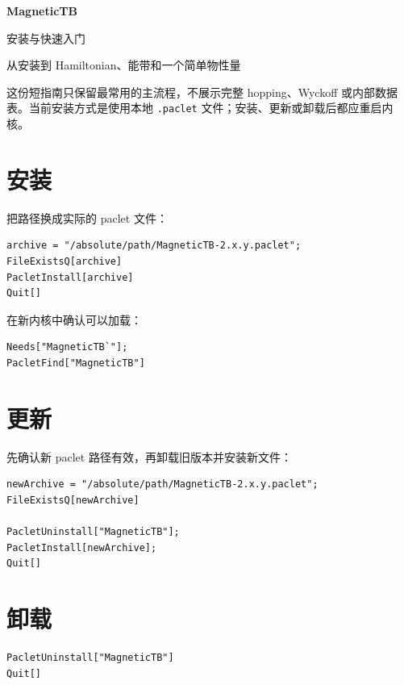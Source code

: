 \documentclass[UTF8,fontset=mac,11pt]{ctexart}
\begin{document}
\begin{center}
  {\Huge\bfseries\color{MagneticTBBlue} MagneticTB}\par
  \vspace{0.35em}
  {\LARGE 安装与快速入门}\par
  \vspace{0.7em}
  {\large 从安装到 Hamiltonian、能带和一个简单物性量}
\end{center}

\vspace{0.8em}

这份短指南只保留最常用的主流程，不展示完整 hopping、Wyckoff
或内部数据表。当前安装方式是使用本地 \texttt{.paclet} 文件；安装、更新或卸载后都应重启内核。

\section{安装}

把路径换成实际的 paclet 文件：

\begin{lstlisting}
archive = "/absolute/path/MagneticTB-2.x.y.paclet";
FileExistsQ[archive]
PacletInstall[archive]
Quit[]
\end{lstlisting}

在新内核中确认可以加载：

\begin{lstlisting}
Needs["MagneticTB`"];
PacletFind["MagneticTB"]
\end{lstlisting}

\section{更新}

先确认新 paclet 路径有效，再卸载旧版本并安装新文件：

\begin{lstlisting}
newArchive = "/absolute/path/MagneticTB-2.x.y.paclet";
FileExistsQ[newArchive]

PacletUninstall["MagneticTB"];
PacletInstall[newArchive];
Quit[]
\end{lstlisting}

\section{卸载}

\begin{lstlisting}
PacletUninstall["MagneticTB"]
Quit[]
\end{lstlisting}
\end{document}
